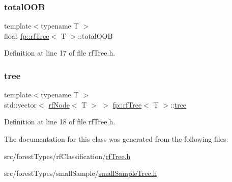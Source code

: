 \subsubsection{\texorpdfstring{total\+O\+OB}{totalOOB}}
{\footnotesize\ttfamily template$<$typename T $>$ \\
float \hyperlink{classfp_1_1rfTree}{fp\+::rf\+Tree}$<$ T $>$\+::total\+O\+OB\hspace{0.3cm}{\ttfamily [protected]}}



Definition at line 17 of file rf\+Tree.\+h.

\mbox{\label{classfp_1_1rfTree_a1d5c209715f4044a85878c17e2b3ee53}} 
\subsubsection{\texorpdfstring{tree}{tree}}
{\footnotesize\ttfamily template$<$typename T $>$ \\
std\+::vector$<$ \hyperlink{classrfNode}{rf\+Node}$<$ T $>$ $>$ \hyperlink{classfp_1_1rfTree}{fp\+::rf\+Tree}$<$ T $>$\+::\hyperlink{classtree}{tree}\hspace{0.3cm}{\ttfamily [protected]}}



Definition at line 18 of file rf\+Tree.\+h.



The documentation for this class was generated from the following files\+:\begin{DoxyCompactItemize}
\item 
src/forest\+Types/rf\+Classification/\hyperlink{rfTree_8h}{rf\+Tree.\+h}\item 
src/forest\+Types/small\+Sample/\hyperlink{smallSampleTree_8h}{small\+Sample\+Tree.\+h}\end{DoxyCompactItemize}
